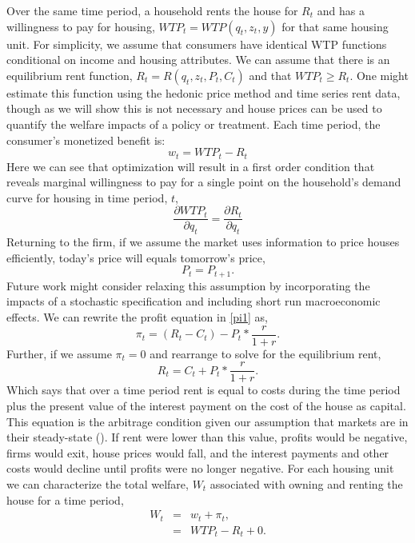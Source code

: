 \documentclass[ecta,nameyear,draft]{econsocart}
\theoremstyle{plain}
\theoremstyle{remark}
\begin{document}
Over the same time period, a household rents the house for $R_t$ and has a willingness to pay for housing, $\mathit{WTP}_t=\mathit{WTP}(q_t,z_t,y)$ for that same housing unit. For simplicity, we assume that consumers have identical WTP functions conditional on income and housing attributes. We can assume that there is an equilibrium rent function, $R_t=R(q_t,z_t,P_t,C_t)$ and that $\mathit{WTP}_t \geq R_t$. One might estimate this function using the hedonic price method and time series rent data, though as we will show this is not necessary and house prices can be used to quantify the welfare impacts of a policy or treatment. 
Each time period, the consumer’s monetized benefit is:
\begin{equation*}
	 w_t=\mathit{WTP}_t-R_t
\end{equation*}
Here we can see that optimization will result in a first order condition that reveals marginal willingness
to pay for a single point on the household’s demand curve for housing in time period, $t$,
\begin{equation}
	\frac{\partial \mathit{WTP}_t}{\partial q_t}=\frac{\partial R_t}{\partial q_t} \label{foc}
\end{equation}
Returning to the firm, if we assume the market uses information to price houses efficiently, today’s price will equals tomorrow’s
price,
\begin{equation*}
	P_t=P_{t+1}.
\end{equation*}
Future work might consider relaxing this assumption by incorporating the impacts of a stochastic
specification and including short run macroeconomic effects.
We can rewrite the profit equation in \ref{pi1} as,
\begin{equation}
	\pi_t=(R_t-C_t)-P_t*\frac{r}{1+r}.\label{pi1.1}
\end{equation}
Further, if we assume $\pi_t=0$ and rearrange to solve for the equilibrium rent,
\begin{equation}
	R_t=C_t+P_t*\frac{r}{1+r}.\label{rent1}
\end{equation}
Which says that over a time period rent is equal to costs during the time period plus the present value of
the interest payment on the cost of the house as capital. This equation is the arbitrage condition given our assumption that markets are in their steady-state (\cite{poterba84}). If rent were lower than this value, profits
would be negative, firms would exit, house prices would fall, and the interest payments and other costs
would decline until profits were no longer negative.
For each housing unit we can characterize the total welfare, $W_t$ associated with owning and renting the house for a time period,
\begin{eqnarray*}
	W_t & = & w_t+\pi_t,\\
	& = & \mathit{WTP}_t-R_t+0.
\end{eqnarray*}
\end{document}
